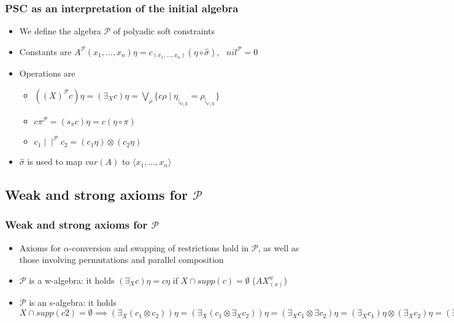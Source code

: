 \documentclass{beamer}
\begin{document}
\begin{frame}
\frametitle{PSC as an interpretation of the initial algebra}
\begin{itemize}
	\item We define the algebra $\mathcal{P}$ of polyadic soft constraints
\medskip
	\item Constants are $A^{\mathcal{P}}(x_1,...,x_n)\eta = 
	c_{(x_1,...,x_n)}(\eta \circ \widehat{\sigma})$, \ $nil^{\mathcal{P}} = 0$
\medskip
	\item Operations are
	\begin{itemize}
		\item $((X)^{\mathcal{P}} c) \eta = (\exists_X c)\eta = 
		\bigvee_\rho \{ c\rho \mid \eta_{\mid_{\mathbb{V} 
		\setminus X}} = \rho_{\mid_{\mathbb{V} \setminus X}}\}$
		\item $c \pi^{\mathcal{P}} = (s_\pi c)\eta = c(\eta \circ \pi)$
		\item $c_1 \mid \mid^{\mathcal{P}} c_2 = (c_1\eta) \otimes (c_2\eta)$
	\end{itemize}
\medskip 
	\item $\widehat{\sigma}$ is used to map $var(A)$ to $\langle x_1, ..., x_n \rangle$
\end{itemize}
\end{frame}

\subsection{Weak and strong axioms for $\mathcal{P}$}

\begin{frame}
\frametitle{Weak and strong axioms for $\mathcal{P}$}
\begin{itemize}
	\item Axioms for $\alpha$-conversion and swapping of restrictions hold in $\mathcal{P}$,
	as well as those involving permutations and parallel composition
\medskip
	\item $\mathcal{P}$ is a w-algebra: it holds $(\exists_X c)\eta = c\eta$ 
	if $X \cap supp(c) = \emptyset$ ($AX_{(x)}^w$)
\medskip
	\item $\mathcal{P}$ is an s-algebra: it holds $X \cap supp(c2) = \emptyset \implies
	(\exists_X(c_1 \otimes c_2))\eta = (\exists_X(c_1 \otimes \exists_X c_2))\eta =
	(\exists_X c_1 \otimes \exists c_2)\eta = (\exists_X c_1)\eta \otimes (\exists_X c_2)\eta = 
	(\exists_X c_1)\eta \otimes c_2\eta$
\end{itemize}
\end{frame}
\end{document}
